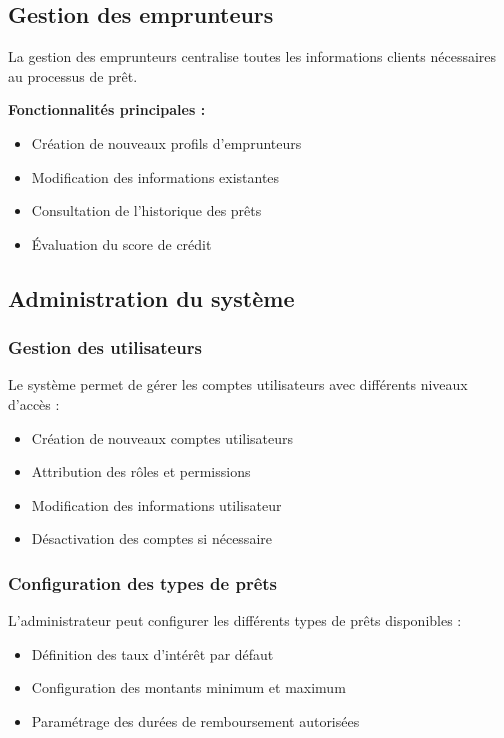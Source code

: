 \documentclass[12pt,a4paper]{report}
\begin{document}
\subsection{Gestion des emprunteurs}

La gestion des emprunteurs centralise toutes les informations clients nécessaires au processus de prêt.

\textbf{Fonctionnalités principales :}
\begin{itemize}
    \item Création de nouveaux profils d'emprunteurs
    \item Modification des informations existantes
    \item Consultation de l'historique des prêts
    \item Évaluation du score de crédit
\end{itemize}

\subsection{Administration du système}

\subsubsection{Gestion des utilisateurs}
Le système permet de gérer les comptes utilisateurs avec différents niveaux d'accès :
\begin{itemize}
    \item Création de nouveaux comptes utilisateurs
    \item Attribution des rôles et permissions
    \item Modification des informations utilisateur
    \item Désactivation des comptes si nécessaire
\end{itemize}

\subsubsection{Configuration des types de prêts}
L'administrateur peut configurer les différents types de prêts disponibles :
\begin{itemize}
    \item Définition des taux d'intérêt par défaut
    \item Configuration des montants minimum et maximum
    \item Paramétrage des durées de remboursement autorisées
\end{itemize}
\end{document}
